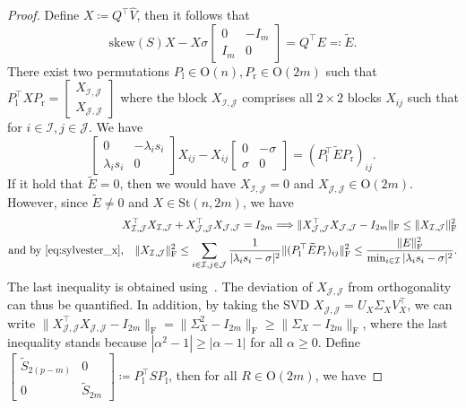 \documentclass[10pt,twoside,dvipsnames]{siamart1116}
\numberwithin{algorithm}{section}
\numberwithin{equation}{section}
\begin{document}
\begin{proof}	
	Define $X\coloneq Q^\top \widehat{V}$, then it follows that
	\begin{equation*}
	\mathrm{skew}(S)X-X\sigma \begin{bmatrix}0&-I_m\\
	I_m&0\end{bmatrix}=Q^\top E\eqcolon \widetilde{E}.
	\end{equation*}
There exist two permutations $P_\mathrm{l}\in\mathrm{O}(n),P_\mathrm{r}\in\mathrm{O}(2m) $ such that $P_\mathrm{l}^\top X P_\mathrm{r}=\left[\begin{smallmatrix}X_{\mathcal{I},\mathcal{J}}  \\X_{\mathcal{J},\mathcal{J}}\end{smallmatrix}\right]$ where the block $X_{\mathcal{I},\mathcal{J}}$ comprises all $2\times 2$ blocks $X_{ij}$ such that for $i\in\mathcal{I}, j\in\mathcal{J}$. We have
\begin{equation}\label{eq:sylvester_x}
\begin{bmatrix}
		0&-\lambda_i s_i\\
		\lambda_i s_i&0
	\end{bmatrix}X_{ij}-X_{ij}\begin{bmatrix}
		0&-\sigma\\
		\sigma&0
	\end{bmatrix}=(P_\mathrm{l}^\top \widetilde{E} P_\mathrm{r})_{ij}.
\end{equation} 
If it hold that $\widetilde{E}=0$, then we would have $X_{\mathcal{I},\mathcal{J}}=0 $ and $X_{\mathcal{J},\mathcal{J}}\in\mathrm{O}(2m)$. However, since $\widetilde{E}\neq 0$ and $X\in\mathrm{St}(n,2m)$, we have
\begin{align*}
 X_{\mathcal{I},\mathcal{J}}^\top X_{\mathcal{I},\mathcal{J}} +X_{\mathcal{J},\mathcal{J}}^\top X_{\mathcal{J},\mathcal{J}} = I_{2m} \Longrightarrow \| X_{\mathcal{J},\mathcal{J}}^\top X_{\mathcal{J},\mathcal{J}}-I_{2m}\|_\mathrm{F}\leq \| X_{\mathcal{I},\mathcal{J}}\|_\mathrm{F}^2\\
 \text{and by \eqref{eq:sylvester_x},}\quad \| X_{\mathcal{I},\mathcal{J}}\|_\mathrm{F}^2\leq \sum_{i\in\mathcal{I}, j\in\mathcal{J}} \frac{1}{|\lambda_i s_i-\sigma|^2}\|(P_\mathrm{l}^\top \widetilde{E} P_\mathrm{r})_{ij}\|_\mathrm{F}^2\leq \frac{\|E\|_\mathrm{F}^2}{\min_{i\in\mathcal{I}}|\lambda_i s_i-\sigma|^2}.
\end{align*}
The last inequality is obtained using~\cite[Thm.~VII.2.8]{bhatia97}. The deviation of $X_{\mathcal{J},\mathcal{J}}$ from orthogonality can thus be quantified. In addition, by taking the SVD $ X_{\mathcal{J},\mathcal{J}}=U_X\Sigma_X V_X^\top$, we can write $\| X_{\mathcal{J},\mathcal{J}}^\top X_{\mathcal{J},\mathcal{J}}-I_{2m}\|_\mathrm{F}=\|\Sigma_X^2-I_{2m}\|_\mathrm{F}\geq \|\Sigma_X-I_{2m}\|_\mathrm{F}$, where the last inequality stands because $|\alpha^2-1|\geq |\alpha-1|$ for all $\alpha\geq 0$. Define $\left[\begin{smallmatrix}\widetilde{S}_{2(p-m)} &0 \\ 0 &\widetilde{S}_{2m}\end{smallmatrix}\right]\coloneq P_\mathrm{l}^\top S P_\mathrm{l}$, then for all $R\in \mathrm{O}(2m)$, we have 

\end{proof}
\end{document}
